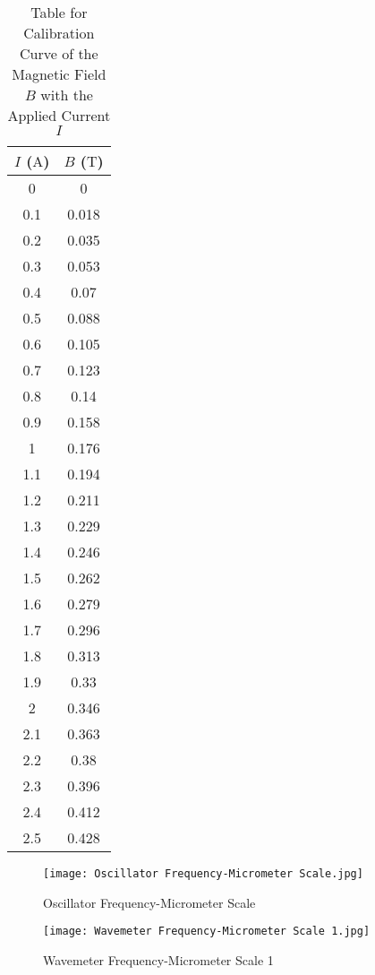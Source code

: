 \documentclass[11pt]{article}
\begin{document}
	\begin{table}[htbp]
		\centering
		\caption{Table for Calibration Curve of the Magnetic Field $B$ with the Applied Current $I$}
		\begin{tabular}{cc}
			\toprule
			$I$ ($\unit{\ampere}$) & $B$ ($\unit{\tesla}$) \\
			\midrule
			0 & 0 \\
			0.1 & 0.018 \\
			0.2 & 0.035 \\
			0.3 & 0.053 \\
			0.4 & 0.07 \\
			0.5 & 0.088 \\
			0.6 & 0.105 \\
			0.7 & 0.123 \\
			0.8 & 0.14 \\
			0.9 & 0.158 \\
			1 & 0.176 \\
			1.1 & 0.194 \\
			1.2 & 0.211 \\
			1.3 & 0.229 \\
			1.4 & 0.246 \\
			1.5 & 0.262 \\
			1.6 & 0.279 \\
			1.7 & 0.296 \\
			1.8 & 0.313 \\
			1.9 & 0.33 \\
			2 & 0.346 \\
			2.1 & 0.363 \\
			2.2 & 0.38 \\
			2.3 & 0.396 \\
			2.4 & 0.412 \\
			2.5 & 0.428 \\
			\bottomrule
		\end{tabular}%
		\label{tab:Calibration}%
	\end{table}%
	
	\begin{figure}[htbp]
		\centering
		\caption{Oscillator Frequency-Micrometer Scale}
		\texttt{[image: Oscillator Frequency-Micrometer Scale.jpg]}
		\label{fig:Oscillator}
	\end{figure}
	
	\begin{figure}[htbp]
		\centering
		\caption{Wavemeter Frequency-Micrometer Scale 1}
		\texttt{[image: Wavemeter Frequency-Micrometer Scale 1.jpg]}
		\label{fig:Wavemeter1}
	\end{figure}
	
\end{document}
